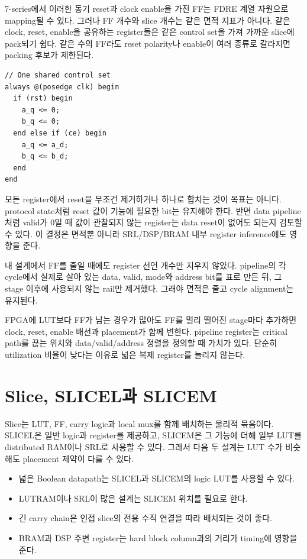 7-series에서 이러한 동기 reset과 clock enable을 가진 FF는 FDRE 계열 자원으로
mapping될 수 있다. 그러나 FF 개수와 slice 개수는 같은 면적 지표가 아니다.
같은 clock, reset, enable을 공유하는 register들은 같은 control set을 가져
가까운 slice에 pack되기 쉽다. 같은 수의 FF라도 reset polarity나 enable이
여러 종류로 갈라지면 packing 후보가 제한된다.

\begin{lstlisting}
// One shared control set
always @(posedge clk) begin
  if (rst) begin
    a_q <= 0;
    b_q <= 0;
  end else if (ce) begin
    a_q <= a_d;
    b_q <= b_d;
  end
end
\end{lstlisting}

모든 register에서 reset을 무조건 제거하거나 하나로 합치는 것이 목표는 아니다.
protocol state처럼 reset 값이 기능에 필요한 bit는 유지해야 한다. 반면 data
pipeline처럼 valid가 0일 때 값이 관찰되지 않는 register는 data reset이 없어도
되는지 검토할 수 있다. 이 결정은 면적뿐 아니라 SRL/DSP/BRAM 내부 register
inference에도 영향을 준다.

내 설계에서 FF를 줄일 때에도 register 선언 개수만 지우지 않았다. pipeline의
각 cycle에서 실제로 살아 있는 data, valid, mode와 address bit를 표로 만든 뒤,
그 stage 이후에 사용되지 않는 rail만 제거했다. 그래야 면적은 줄고 cycle
alignment는 유지된다.

\begin{warningbox}
FPGA에 LUT보다 FF가 남는 경우가 많아도 FF를 멀리 떨어진 stage마다 추가하면
clock, reset, enable 배선과 placement가 함께 변한다. pipeline register는
critical path를 끊는 위치와 data/valid/address 정렬을 정의할 때 가치가 있다.
단순히 utilization 비율이 낮다는 이유로 넓은 복제 register를 늘리지 않는다.
\end{warningbox}

\section{Slice, SLICEL과 SLICEM}

Slice는 LUT, FF, carry logic과 local mux를 함께 배치하는 물리적 묶음이다.
SLICEL은 일반 logic과 register를 제공하고, SLICEM은 그 기능에 더해 일부 LUT를
distributed RAM이나 SRL로 사용할 수 있다. 그래서 다음 두 설계는 LUT 수가
비슷해도 placement 제약이 다를 수 있다.

\begin{itemize}
  \item 넓은 Boolean datapath는 SLICEL과 SLICEM의 logic LUT를 사용할 수 있다.
  \item LUTRAM이나 SRL이 많은 설계는 SLICEM 위치를 필요로 한다.
  \item 긴 carry chain은 인접 slice의 전용 수직 연결을 따라 배치되는 것이 좋다.
  \item BRAM과 DSP 주변 register는 hard block column과의 거리가 timing에 영향을 준다.
\end{itemize}

